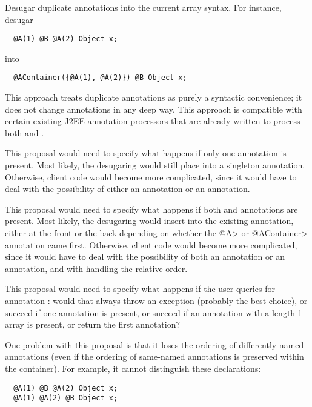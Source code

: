 \documentclass[10pt]{article}
\begin{document}
Desugar duplicate annotations into
the current array syntax.  For instance, desugar

\begin{Verbatim}
  @A(1) @B @A(2) Object x;
\end{Verbatim}

\noindent
into

\begin{Verbatim}
  @AContainer({@A(1), @A(2)}) @B Object x;
\end{Verbatim}

This approach treats duplicate annotations as purely a syntactic
convenience; it does not change annotations in any deep way.  This approach
is compatible with certain existing J2EE annotation processors that are
already written to process both  and .

This proposal would need to specify what happens if only one 
annotation is present.  Most likely, the desugaring
would still place  into a singleton  annotation.
Otherwise, client code would become more complicated, since it would have
to deal with the possibility of either an  annotation or an
 annotation.

This proposal would need to specify what happens if both  and
 annotations are present.  Most likely, the desugaring
would insert  into the existing  annotation,
either at the front or the back depending on whether the \<@A> or
\<@AContainer> annotation came first.
Otherwise, client code would become more complicated, since it would have
to deal with the possibility of both an  annotation or an
 annotation, and with handling the relative order.

This proposal would need to specify what happens if the user queries for
annotation :  would that always throw an exception (probably the
best choice), or succeed if one  annotation is present, or succeed
if an  annotation with a length-1 array is present, or
return the first  annotation?

One problem with this proposal is that it loses the ordering of
differently-named annotations (even if the ordering of same-named
annotations is preserved within the container).  For example, it cannot
distinguish these
declarations:
\begin{Verbatim}
  @A(1) @B @A(2) Object x;
  @A(1) @A(2) @B Object x;
\end{Verbatim}
\end{document}
